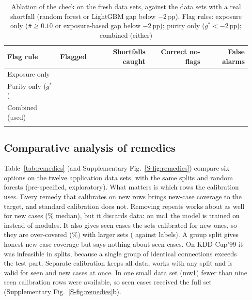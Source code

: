 \begin{table}[!htbp]
\caption{Ablation of the check on the \NAblNds{} fresh data sets, against the \NAblNpos{} data sets with a real shortfall (random forest or LightGBM gap below $-2$\,pp). Flag rules: exposure only ($\bar\pi\ge0.10$ or exposure-based gap below $-2$\,pp); purity only ($g^*<-2$\,pp); combined (either)}\label{tab:ablation}
\centering\small
\begin{tabular}{@{}lrrrr@{}}
\toprule
Flag rule & Flagged & Shortfalls caught & Correct no-flags & False alarms\\
\midrule
Exposure only & \NAblExpoFlag{} & \NAblExpoSens{} & \NAblExpoSpec{} & \NAblExpoFa{}\\
Purity only ($g^*$) & \NAblPureFlag{} & \NAblPureSens{} & \NAblPureSpec{} & \NAblPureFa{}\\
Combined (used) & \NAblCombFlag{} & \NAblCombSens{} & \NAblCombSpec{} & \NAblCombFa{}\\
\botrule
\end{tabular}
\end{table}


\subsection{Comparative analysis of remedies}\label{sec:res-remedies}
Table~\ref{tab:remedies} (and Supplementary Fig.~\ref{S-fig:remedies}) compare six options on the twelve application data sets, with the same splits and random forests (pre-specified, exploratory). What matters is which rows the calibration uses. Every remedy that calibrates on new rows brings new-case coverage to the target, and standard calibration does not. Removing repeats works about as well for new cases (\NRemDedupNewMed{}\% median), but it discards data: on mc1 the model is trained on \NRemMcOneTrainDedup{} instead of \NRemMcOneTrainFull{} modules. It also gives seen cases the sets calibrated for new ones, so they are over-covered (\NRemDedupSeenCov{}\%) with larger sets (\NRemDedupSeenSize{} against \NRemMCPSeenSize{} labels). A group split gives honest new-case coverage but says nothing about seen cases. On KDD Cup'99 it was infeasible in \NRemGscpKddFail{} splits, because a single group of identical connections exceeds the test part. Separate calibration keeps all data, works with any split and is valid for seen and new cases at once. In one small data set (mw1) fewer than nine seen calibration rows were available, so seen cases received the full set (Supplementary Fig.~\ref{S-fig:remedies}b).



